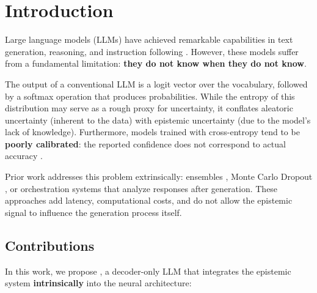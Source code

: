 
\section{Introduction}
\label{sec:introduction}

Large language models (LLMs) have achieved remarkable capabilities in
text generation, reasoning, and instruction following
\cite{brown2020gpt3, touvron2023llama}. However, these models suffer from
a fundamental limitation: \textbf{they do not know when they do not know}.

The output of a conventional LLM is a logit vector over the vocabulary,
followed by a softmax operation that produces probabilities. While the
entropy of this distribution may serve as a rough proxy for uncertainty,
it conflates aleatoric uncertainty (inherent to the data) with epistemic
uncertainty (due to the model's lack of knowledge). Furthermore, models
trained with cross-entropy tend to be \textbf{poorly calibrated}: the
reported confidence does not correspond to actual accuracy
\cite{guo2017calibration}.

Prior work addresses this problem extrinsically: ensembles
\cite{lakshminarayanan2017simple}, Monte Carlo Dropout
\cite{gal2016dropout}, or orchestration systems that analyze responses
after generation. These approaches add latency, computational costs,
and do not allow the epistemic signal to influence the generation
process itself.

\subsection{Contributions}

In this work, we propose \aletheion{}, a decoder-only LLM that integrates
the epistemic system \textbf{intrinsically} into the neural architecture:

